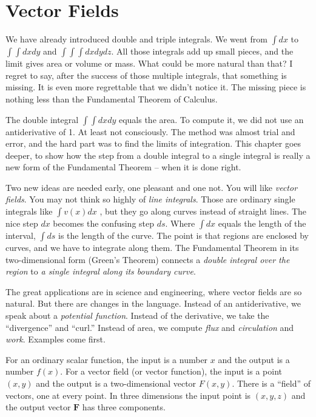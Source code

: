 \section{Vector Fields}\label{sec:vector_fields}
We have already introduced double and triple integrals. We went from $\int dx$ to $\int \int  dx dy$ and
$\int \int \int dx dy dz$. All those integrals add up small pieces, and the limit gives area or volume
or mass. What could be more natural than that? I regret to say, after the success of
those multiple integrals, that something is missing. It is even more regrettable that
we didn't notice it. The missing piece is nothing less than the Fundamental Theorem
of Calculus.

The double integral $\int \int dx dy$ equals the area. To compute it, we did not use an
antiderivative of 1. At least not consciously. The method was almost trial and error,
and the hard part was to find the limits of integration. This chapter goes deeper, to
show how the step from a double integral to a single integral is really a new form of
the Fundamental Theorem -- when it is done right.

Two new ideas are needed early, one pleasant and one not. You will like \emph{vector
fields}. You may not think so highly of \emph{line integrals}. Those are ordinary single integrals
like $\int v(x) dx$ , but they go along curves instead of straight lines. The nice step $dx$
becomes the confusing step $ds$. Where $\int dx$ equals the length of the interval, $\int ds$ is
the length of the curve. The point is that regions are enclosed by curves, and we have
to integrate along them. The Fundamental Theorem in its two-dimensional form
(Green's Theorem) connects a \emph{double integral over the region} to \emph{a single integral along
its boundary curve}.

The great applications are in science and engineering, where vector fields are so
natural. But there are changes in the language. Instead of an antiderivative, we speak
about a \emph{potential function}. Instead of the derivative, we take the ``divergence'' and
``curl.'' Instead of area, we compute \emph{flux} and \emph{circulation} and \emph{work}. Examples come
first.

For an ordinary scalar function, the input is a number $x$ and the output is a number
$f(x)$. For a vector field (or vector function), the input is a point $(x, y)$ and the output
is a two-dimensional vector $F(x, y)$. There is a ``field'' of vectors, one at every point.
In three dimensions the input point is $(x, y, z)$ and the output vector $\mathbf{F}$ has three
components.

